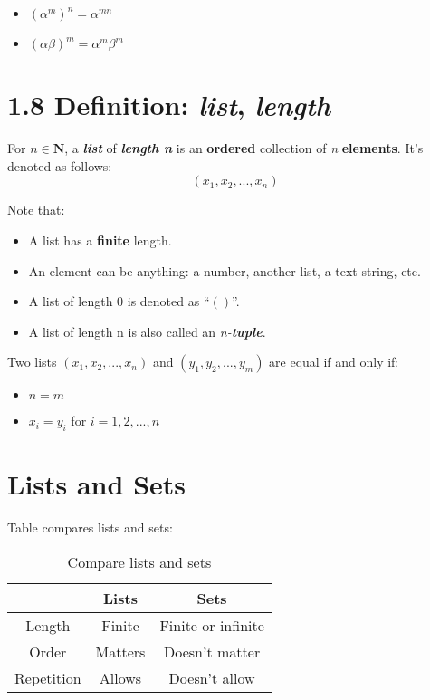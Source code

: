 \documentclass[12pt, letterpaper, oneside]{book}
\begin{document}
\begin{itemize}
  \item $(\alpha^m)^n = \alpha^{mn}$
  \item $(\alpha\beta)^m = \alpha^m\beta^m$
\end{itemize}

\section{1.8 Definition: \textit{list}, \textit{length}}

For $n \in \mathbf{N}$, a \textbf{\textit{list}} of \textbf{\textit{length n}}
is an \textbf{ordered} collection of \textit{n} \textbf{elements}. It's denoted
as follows: \[ (x_1, x_2, ..., x_n) \]

Note that:
\begin{itemize}
  \item A list has a \textbf{finite} length.
  \item An element can be anything: a number, another list, a text string, etc.
  \item A list of length 0 is denoted as ``$()$''.
  \item A list of length n is also called an \textit{n-\textbf{tuple}}.
\end{itemize}

Two lists $(x_1, x_2, ..., x_n)$ and $(y_1, y_2, ..., y_m)$ are equal if and
only if:
\begin{itemize}
  \item $n = m$
  \item $x_i = y_i$ for $i = 1, 2, ..., n$
\end{itemize}

\section{Lists and Sets}

Table compares lists and sets:
\begin{table}[ht!]
\centering
\begin{tabular}{||c c c ||} 
 \hline
   & Lists & Sets \\ [0.5ex] 
 \hline
 \hline
 Length & Finite & Finite or infinite \\ 
 Order & Matters & Doesn't matter \\
 Repetition & Allows & Doesn't allow \\ [1ex]
 \hline
\end{tabular}
\caption{Compare lists and sets}
\label{table:lists_sets_comp}
\end{table}
\end{document}
